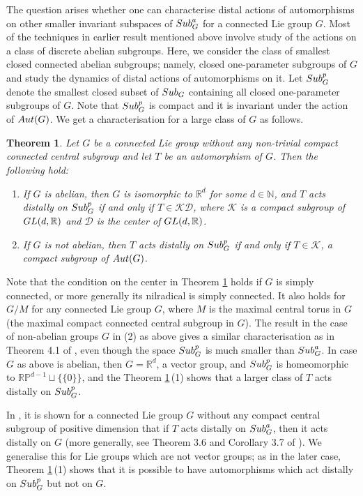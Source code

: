 \documentclass{amsart}
\numberwithin{equation}{section}
\newcommand{\Aut}{{\rm Aut}}
\newcommand{\Sub}{{\rm Sub}}
\newcommand{\N}{{\mathbb N}}
\newcommand{\R}{{\mathbb R}}
\newcommand{\K}{{\mathcal K}}
\newcommand{\D}{{\mathcal D}}
\newcommand{\RP}{{\mathbb{RP}}}
\newcommand{\spg}{{\rm Sub}^p_G}
\newcommand{\GL}{{\rm GL}}
\newtheorem{thm}{Theorem}[section]
\theoremstyle{remark}
\begin{document}
The question arises whether one can characterise distal actions of automorphisms on other smaller invariant 
subspaces of $\Sub^a_G$ for a connected Lie group $G$. Most of the techniques in earlier result mentioned 
above involve study of the actions 
on a class of discrete abelian subgroups. Here, we consider the class of smallest closed connected 
abelian subgroups; namely, closed one-parameter subgroups of $G$ and study the dynamics of distal actions of 
automorphisms on it. Let $\spg$ denote the smallest closed subset of $\Sub_G$ containing all closed 
one-parameter subgroups of $G$. Note that $\spg$ is compact and it is invariant under the action of $\Aut(G)$. 
We get a characterisation for a large class of $G$ as follows. 

 \begin{thm}\label{main}
 Let $G$ be a connected Lie group without any non-trivial compact connected central subgroup and 
 let $T$ be an automorphism of $G$. Then the following hold:
 \begin{enumerate} 
 \item[{(1)}] If $G$ is abelian, then $G$ is isomorphic to $\R^d$ for some $d\in\N$, and  
 $T$ acts distally on $\spg$ if and only if $T \in \K\D$, where $\K$ is a 
 compact subgroup of $\GL(d,\R)$  and $\D$ is the center of $\GL(d,\R)$.
 \item[{(2)}] If $G$ is not abelian, then $T$ acts distally on $\spg$ if and only if $T \in \K$, a compact 
 subgroup of $\Aut(G)$.
 \end{enumerate}
 \end{thm} 

Note that the condition on the center in Theorem \ref{main} holds if $G$ is simply connected, 
or more generally its nilradical is simply connected. 
It also holds for $G/M$ for any connected Lie group $G$, where $M$ is the maximal central torus in $G$ 
(the maximal compact connected central subgroup in $G$). The result in the case of non-abelian 
groups $G$ in (2) as above gives a similar characterisation as in Theorem 4.1 of \cite{SY3}, even though 
the space $\spg$ is much smaller than $\Sub^a_G$. In case $G$ as above is abelian, then $G=\R^d$, 
a vector group, and $\spg$ is homeomorphic to $\RP^{d-1}\sqcup\{\{0\}\}$, and the 
Theorem \ref{main}\,(1) shows that a larger class of $T$ acts distally on $\spg$.

In \cite{SY3}, it is shown for a connected Lie group $G$ without any compact central subgroup 
of positive dimension that if $T$ acts distally on $\Sub^a_G$, then 
it acts distally on $G$ (more generally, see Theorem 3.6 and Corollary 3.7 of \cite{SY3}). We generalise 
this for Lie groups which are not vector groups; as in the later case, Theorem \ref{main}\,(1) shows that it is 
possible to have automorphisms which act distally on $\spg$ but not on $G$.
\end{document}
